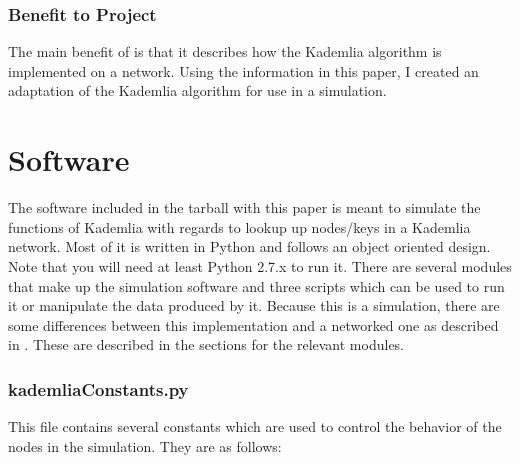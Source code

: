 \documentclass[notitlepage,12pt]{article}
\begin{document}
\subsubsection{Benefit to Project}
\label{sec:benp3}

The main benefit of \cite{kademlia} is that it describes how the Kademlia algorithm
is implemented on a network. Using the information in this paper, I created an
adaptation of the Kademlia algorithm for use in a simulation. 

\section{Software}
\label{sec:software}

The software included in the tarball with this paper is meant to simulate the
functions of Kademlia with regards to lookup up nodes/keys in a Kademlia
network. Most of it is written in Python and follows an object oriented
design. Note that you will need at least Python 2.7.x to run it. There are
several modules that make up the simulation software and three scripts which can
be used to run it or manipulate the data produced by it. Because this is a
simulation, there are some differences between this implementation and a
networked one as described in \cite{kademlia}. These are described in the
sections for the relevant modules.

\subsubsection{kademliaConstants.py}
\label{sec:kadcontsts}

This file contains several constants which are used to control the
behavior of the nodes in the simulation. They are as follows:
\end{document}
